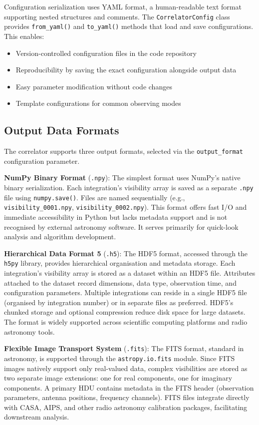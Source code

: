 Configuration serialization uses YAML format, a human-readable text format supporting nested structures and comments. The \texttt{CorrelatorConfig} class provides \texttt{from\_yaml()} and \texttt{to\_yaml()} methods that load and save configurations. This enables:

\begin{itemize}
    \item Version-controlled configuration files in the code repository
    \item Reproducibility by saving the exact configuration alongside output data
    \item Easy parameter modification without code changes
    \item Template configurations for common observing modes
\end{itemize}

\subsection{Output Data Formats}

The correlator supports three output formats, selected via the \texttt{output\_format} configuration parameter.

\textbf{NumPy Binary Format} (\texttt{.npy}): The simplest format uses NumPy's native binary serialization. Each integration's visibility array is saved as a separate \texttt{.npy} file using \texttt{numpy.save()}. Files are named sequentially (e.g., \texttt{visibility\_0001.npy}, \texttt{visibility\_0002.npy}). This format offers fast I/O and immediate accessibility in Python but lacks metadata support and is not recognised by external astronomy software. It serves primarily for quick-look analysis and algorithm development.

\textbf{Hierarchical Data Format 5} (\texttt{.h5}): The HDF5 format, accessed through the \texttt{h5py} library, provides hierarchical organisation and metadata storage. Each integration's visibility array is stored as a dataset within an HDF5 file. Attributes attached to the dataset record dimensions, data type, observation time, and configuration parameters. Multiple integrations can reside in a single HDF5 file (organised by integration number) or in separate files as preferred. HDF5's chunked storage and optional compression reduce disk space for large datasets. The format is widely supported across scientific computing platforms and radio astronomy tools.

\textbf{Flexible Image Transport System} (\texttt{.fits}): The FITS format, standard in astronomy, is supported through the \texttt{astropy.io.fits} module. Since FITS images natively support only real-valued data, complex visibilities are stored as two separate image extensions: one for real components, one for imaginary components. A primary HDU contains metadata in the FITS header (observation parameters, antenna positions, frequency channels). FITS files integrate directly with CASA, AIPS, and other radio astronomy calibration packages, facilitating downstream analysis.

